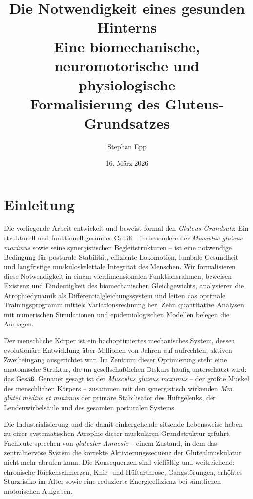 ﻿\documentclass[12pt,a4paper]{report}
\title{\textbf{Die Notwendigkeit eines gesunden Hinterns}\\[0.4em]
	\large Eine biomechanische, neuromotorische und physiologische\\
	Formalisierung des Gluteus-Grundsatzes}
\author{Stephan Epp}
\date{16. März 2026}
\theoremstyle{plain}
\theoremstyle{definition}
\theoremstyle{remark}
\begin{document}
	\maketitle
	
	\tableofcontents
	\newpage
	
	\chapter{Einleitung}
	Die vorliegende Arbeit entwickelt und beweist formal den \emph{Gluteus-Grundsatz}:
	Ein strukturell und funktionell gesundes Gesäß -- insbesondere der
	\emph{Musculus gluteus maximus} sowie seine synergistischen Begleitstrukturen --
	ist eine notwendige Bedingung für posturale Stabilität, effiziente Lokomotion,
	lumbale Gesundheit und langfristige muskuloskelettale Integrität des Menschen.
	Wir formalisieren diese Notwendigkeit in einem vierdimensionalen Funktionsrahmen,
	beweisen Existenz und Eindeutigkeit des biomechanischen Gleichgewichts,
	analysieren die Atrophiedynamik als Differentialgleichungssystem und
	leiten das optimale Trainingsprogramm mittels Variationsrechnung her.
	Zehn quantitative Analysen mit numerischen Simulationen und
	epidemiologischen Modellen belegen die Aussagen.
	
	Der menschliche Körper ist ein hochoptimiertes mechanisches System, dessen
	evolutionäre Entwicklung über Millionen von Jahren auf aufrechten, aktiven
	Zweibeingang ausgerichtet war. Im Zentrum dieser Optimierung steht eine
	anatomische Struktur, die im gesellschaftlichen Diskurs häufig unterschätzt wird:
	das Gesäß. Genauer gesagt ist der \emph{Musculus gluteus maximus}
	-- der größte Muskel des menschlichen Körpers -- zusammen mit den synergistisch
	wirkenden \emph{Mm. glutei medius et minimus} der primäre Stabilisator des
	Hüftgelenks, der Lendenwirbelsäule und des gesamten posturalen Systems.
	
	Die Industrialisierung und die damit einhergehende sitzende Lebensweise haben
	zu einer systematischen Atrophie dieser muskulären Grundstruktur geführt.
	Fachleute sprechen von \emph{glutealer Amnesie} -- einem Zustand, in dem
	das zentralnervöse System die korrekte Aktivierungssequenz der Glutealmuskulatur
	nicht mehr abrufen kann. Die Konsequenzen sind vielfältig und weitreichend:
	chronische Rückenschmerzen, Knie- und Hüftarthrose, Gangstörungen,
	erhöhtes Sturzrisiko im Alter sowie eine reduzierte Energieeffizienz
	bei sämtlichen motorischen Aufgaben.
	
\end{document}
